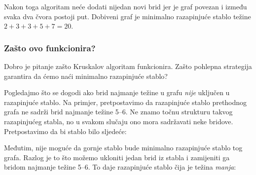 Nakon toga algoritam neće dodati nijedan
novi brid jer je graf povezan
i između svaka dva čvora postoji put.
Dobiveni graf je minimalno razapinjuće stablo
težine $2+3+3+5+7=20$.

\subsubsection{Zašto ovo funkcionira?}

Dobro je pitanje zašto Kruskalov algoritam funkcionira.
Zašto pohlepna strategija garantira da ćemo
naći minimalno razapinjuće stablo?

Pogledajmo što se dogodi ako brid najmanje težine u
grafu \emph{nije} uključen u razapinjuće stablo.
Na primjer, pretpostavimo da razapinjuće stablo
prethodnog grafa ne sadrži
brid najmanje težine 5--6.
Ne znamo točnu strukturu takvog razapinjućeg stabla,
no u svakom slučaju ono mora sadržavati neke bridove.
Pretpostavimo da bi stablo bilo sljedeće:

\begin{center}
\end{center}

Međutim, nije moguće da gornje stablo
bude minimalno razapinjuće stablo tog grafa.
Razlog je to što možemo ukloniti jedan brid
iz stabla i zamijeniti ga bridom najmanje težine 5--6.
To daje razapinjuće stablo čija je težina
\emph{manja}:

\begin{center}
\end{center}

